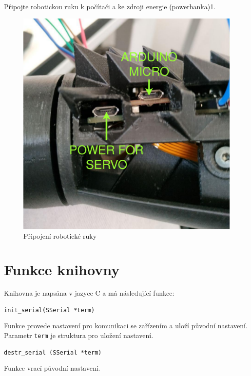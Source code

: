 \documentclass[thesis=B,czech]{FITthesis}[2012/06/26]
\begin{document}
\newpage

Připojte robotickou ruku k počítači a ke zdroji energie (powerbanka)\ref{fig:Instr3}.

 \begin{figure}[H]
\centering
\includegraphics[scale=0.25]{./image/inst2.png}
\caption{Připojení robotické ruky}
\label{fig:Instr3}
\end{figure} 
\section{Funkce knihovny}


Knihovna je napsána v jazyce C a má následující funkce:

\hspace{2cm}

\texttt{init\_serial(SSerial *term)}


Funkce provede nastavení pro komunikaci se zařízením a uloží původní nastavení. Parametr \texttt{term} je struktura pro uložení nastavení.


\hspace{2cm}


\texttt{destr\_serial (SSerial *term)}


Funkce vrací původní nastavení.


\hspace{2cm}
\end{document}
